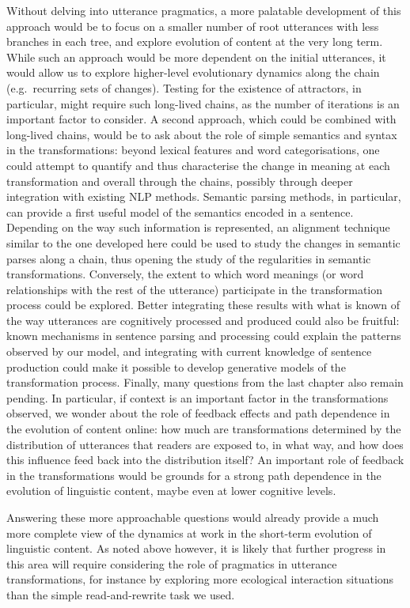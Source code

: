 \documentclass[a4paper,fleqn]{cas-dc}
\begin{document}
Without delving into utterance pragmatics, a more palatable development
of this approach would be to focus on a smaller number of root
utterances with less branches in each tree, and explore evolution of
content at the very long term. While such an approach would be more
dependent on the initial utterances, it would allow us to explore
higher-level evolutionary dynamics along the chain (e.g.~recurring sets
of changes). Testing for the existence of attractors, in particular,
might require such long-lived chains, as the number of iterations is an
important factor to consider. A second approach, which could be combined
with long-lived chains, would be to ask about the role of simple
semantics and syntax in the transformations: beyond lexical features and
word categorisations, one could attempt to quantify and thus
characterise the change in meaning at each transformation and overall
through the chains, possibly through deeper integration with existing
NLP methods. Semantic parsing methods, in particular, can provide a
first useful model of the semantics encoded in a sentence. Depending on
the way such information is represented, an alignment technique similar
to the one developed here could be used to study the changes in semantic
parses along a chain, thus opening the study of the regularities in
semantic transformations. Conversely, the extent to which word meanings
(or word relationships with the rest of the utterance) participate in
the transformation process could be explored. Better integrating these
results with what is known of the way utterances are cognitively
processed and produced could also be fruitful: known mechanisms in
sentence parsing and processing could explain the patterns observed by
our model, and integrating with current knowledge of sentence production
could make it possible to develop generative models of the
transformation process. Finally, many questions from the last chapter
also remain pending. In particular, if context is an important factor in
the transformations observed, we wonder about the role of feedback
effects and path dependence in the evolution of content online: how much
are transformations determined by the distribution of utterances that
readers are exposed to, in what way, and how does this influence feed
back into the distribution itself? An important role of feedback in the
transformations would be grounds for a strong path dependence in the
evolution of linguistic content, maybe even at lower cognitive levels.

Answering these more approachable questions would already provide a much
more complete view of the dynamics at work in the short-term evolution
of linguistic content. As noted above however, it is likely that further
progress in this area will require considering the role of pragmatics in
utterance transformations, for instance by exploring more ecological
interaction situations than the simple read-and-rewrite task we used.
\end{document}
